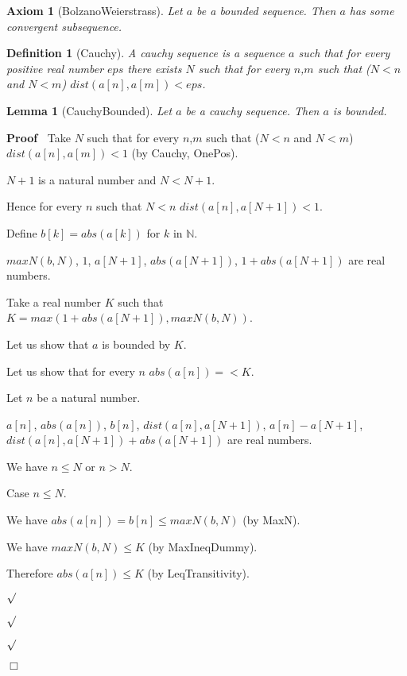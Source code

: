 \documentclass{article}
\newenvironment{forthel}{\begin{leftbar}}{\end{leftbar}}
\newenvironment{proof}{\noindent\textbf{Proof\ }}{\hspace*{\fill}$\Box$\medskip}
\newenvironment{subproof}{\begin{list}{}{}
		\item[\text{Proof}]}{\hfill $\surd$ \end{list}}
\newtheorem{axiom}{Axiom}
\newtheorem{lemma}{Lemma}
\newtheorem{definition}{Definition}
\newcommand{\NN}{\mathbb{N}}
\begin{document}
\begin{forthel}
	\begin{axiom}[BolzanoWeierstrass]
		Let $a$ be a bounded sequence. Then $a$ has some convergent subsequence. 
	\end{axiom}
	
	\begin{definition}[Cauchy]
		A cauchy sequence is a sequence $a$ such that for every positive real number $eps$ there exists $N$ such that
		for every $n$,$m$ such that ($N < n$ and $N < m$) $dist(a[n],a[m]) < eps$.
	\end{definition}
	
	\begin{lemma}[CauchyBounded]
		Let $a$ be a cauchy sequence. Then $a$ is bounded.
	\end{lemma}
	\begin{proof}
		Take $N$ such that for every $n$,$m$ such that ($N < n$ and $N < m$) $dist(a[n],a[m]) < 1$ (by Cauchy, OnePos).
		
		$N + 1$ is a natural number and $N < N + 1$.
		
		Hence for every $n$ such that $N < n$ $dist(a[n],a[N + 1]) < 1$.
		
		Define $b[k] = abs(a[k])$ for $k$ in $\NN$.
		
		$maxN(b,N)$, $1$, $a[N + 1]$, $abs(a[N + 1])$, $1 + abs(a[N + 1])$ are real numbers.
		
		Take a real number $K$ such that $K = max(1 + abs(a[N + 1]), maxN(b,N))$.
		
		Let us show that $a$ is bounded by $K$.
		
		\begin{subproof}
			Let us show that for every $n$ $abs(a[n]) =< K$. 
			
			\begin{subproof}
				Let $n$ be a natural number.
				
				$a[n]$, $abs(a[n])$, $b[n]$, $dist(a[n],a[N + 1])$, $a[n] - a[N + 1]$, $dist(a[n],a[N + 1]) + abs(a[N + 1])$ are real numbers.
				
				We have $n \leq N$ or $n > N$.
				
				Case $n \leq N$.
				
				\begin{subproof}
					We have $abs(a[n]) = b[n] \leq maxN(b,N)$ (by MaxN).
					
					We have $maxN(b,N) \leq K$ (by MaxIneqDummy).
					
					Therefore $abs(a[n]) \leq K$ (by LeqTransitivity).
					
				\end{subproof}	
				

\end{subproof}
\end{subproof}
\end{proof}
\end{forthel}
\end{document}
